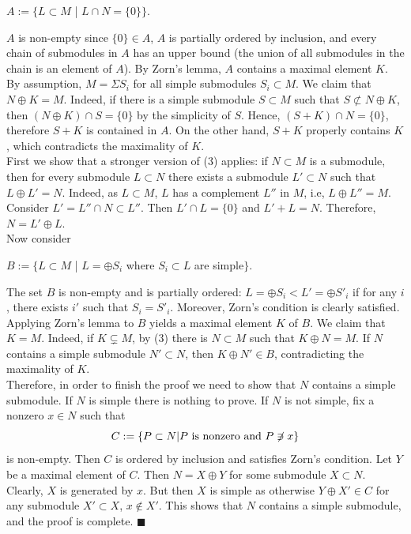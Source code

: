 \begin{center}$A:=\{L\subset M $ | $ L\cap N=\{0\}\}.$
\end{center}
$A$ is non-empty since $\{0\}\in A$, $A$ is partially ordered by inclusion, and every chain of submodules in $A$ has an upper bound (the union of all submodules in the chain is an element of $A$). By Zorn's lemma, $A$ contains a maximal element $K$. By assumption, $M=\Sigma S_i$ for all simple submodules $S_i\subset M$. We claim that $N\oplus K=M$. Indeed, if there is a simple submodule $S\subset M$ such that $S\not\subset N\oplus K$, then $(N\oplus K) \cap S=\{0\}$ by the simplicity of $S$. Hence, $(S+K)\cap N=\{0\}$, therefore $S+ K$ is contained in $A$. On the other hand, $S+K$ properly contains $K$, which contradicts the maximality of $K$.
\\
 First we show that a stronger version of (3) applies: if $N\subset M$ is a submodule, then for every submodule $L\subset N$ there exists a submodule $L'\subset N$ such that $L\oplus L'=N$. Indeed, as $L\subset M$, $L$ has a complement $L''$ in $M$, i.e, $L\oplus L''=M$. Consider $L'=L''\cap N \subset L''$. Then $L'\cap L=\{0\}$ and $L'+L=N$. 
Therefore, $N=L'\oplus L$.
\\
Now consider 
\begin{center}
$B:=\{L\subset M$ | $ L=\oplus S_i$ where $S_i\subset L$ are simple$\}$.\end{center}
The set $B$ is non-empty and is partially ordered: $L=\oplus S_i <L'=\oplus S'_i$ if for any $i$, there exists $i'$ such that $S_i=S'_i$. Moreover, Zorn's condition is clearly satisfied. Applying Zorn's lemma to $B$ yields a maximal element $K$ of $B$. We claim that $K=M$. Indeed, if $K\subsetneq M$, by (3) there is $N\subset M$ such that $K\oplus N=M$. If $N$ contains a simple submodule $N'\subset N$, then $K\oplus N' \in B$, contradicting the maximality of $K$.
\\Therefore, in order to finish the proof we need to show that $N$ contains a simple submodule. If $N$ is simple there is nothing to prove. If $N$ is not simple, fix a nonzero $x\in N$ such that $$C:=\{P\subset N| P \textnormal{ is nonzero and } P\not\ni x\}$$ is non-empty. Then $C$ is ordered by inclusion and satisfies Zorn's condition. Let $Y$ be a maximal element of $C$. Then $N=X\oplus Y$ for some submodule $X\subset N$. Clearly, $X$ is generated by $x$. But then $X$ is simple as otherwise $Y\oplus X'\in C$ for any submodule $X'\subset X$,  $x\not \in X'$. This shows that $N$ contains a simple submodule, and the proof is complete. $\blacksquare$

